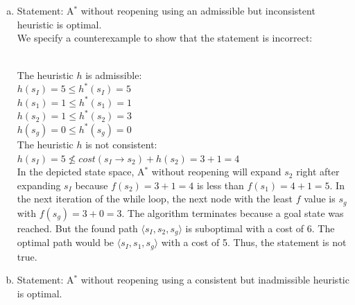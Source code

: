 \documentclass{article} %
\begin{document}
\section{}
\begin{enumerate}[(a)]
    \item Statement: A$^*$ without reopening using an admissible
    but inconsistent heuristic is optimal.\\[0.5em]
    We specify a counterexample to show that the statement is incorrect:\\
    \\[0.7em]
    The heuristic $h$ is admissible:\\
    $h(s_I) = 5 \leq h^*(s_I) = 5$\\
    $h(s_1) = 1 \leq h^*(s_1) = 1$\\
    $h(s_2) = 1 \leq h^*(s_2) = 3$\\
    $h(s_g) = 0 \leq h^*(s_g) = 0$\\[0.5em]
    The heuristic $h$ is not consistent:\\
    $h(s_I) = 5 \not \leq cost(s_I \rightarrow s_2) + h(s_2) = 3 + 1 = 4$\\[0.5em]
    In the depicted state space, A$^*$ without reopening will expand $s_2$ right
    after expanding $s_I$ because $f(s_2) = 3 + 1 = 4$ is less than $f(s_1) = 4 + 1 = 5$.
    In the next iteration of the while loop, the next node with the least $f$ value
    is $s_g$ with $f(s_g) = 3 + 0 = 3$. The algorithm terminates because
    a goal state was reached. But the found path $\langle s_I, s_2, s_g \rangle$
    is suboptimal with a cost of 6. The optimal path would be
    $\langle s_I, s_1, s_g \rangle$ with a cost of 5.
    Thus, the statement is not true.
    \item Statement: A$^*$ without reopening using a consistent
    but inadmissible heuristic is optimal.\\[0.5em]

\end{enumerate}
\end{document}
